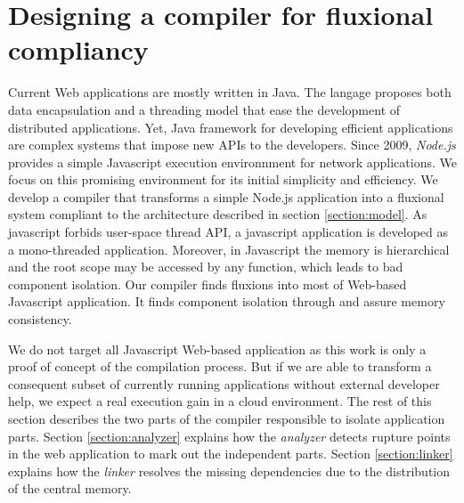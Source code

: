 \section{Designing a compiler for fluxional compliancy} \label{section:compiler}

Current Web applications are mostly written in Java. The langage proposes both data encapsulation and a threading model that ease the development of distributed applications.
Yet, Java framework for developing efficient applications are complex systems that impose new APIs\cite{Coward2003} to the developers.
Since 2009, \textit{Node.js}\cite{Dahl} provides a simple Javascript execution environnment for network applications.
We focus on this promising environment for its initial simplicity and efficiency.
We develop a compiler that transforms a simple Node.js application into a fluxional system compliant to the architecture described in section \ref{section:model}.
As javascript forbids user-space thread API, a javascript application is developed as a mono-threaded application.
Moreover, in Javascript  the memory is hierarchical and the root scope may be accessed by any function, which leads to bad component isolation.
Our compiler finds fluxions into most of Web-based Javascript application.
It finds component isolation through and assure memory consistency.

We do not target all Javascript Web-based application as this work is only a proof of concept of the compilation process.
But if we are able to transform a consequent subset of currently running applications without external developer help, we expect a real execution gain in a cloud environment.
The rest of this section describes the two parts of the compiler responsible to isolate application parts.
Section \ref{section:analyzer} explains how the \textit{analyzer} detects rupture points in the web application to mark out the independent parts.
Section \ref{section:linker} explains how the \textit{linker} resolves the missing dependencies due to the distribution of the central memory.

